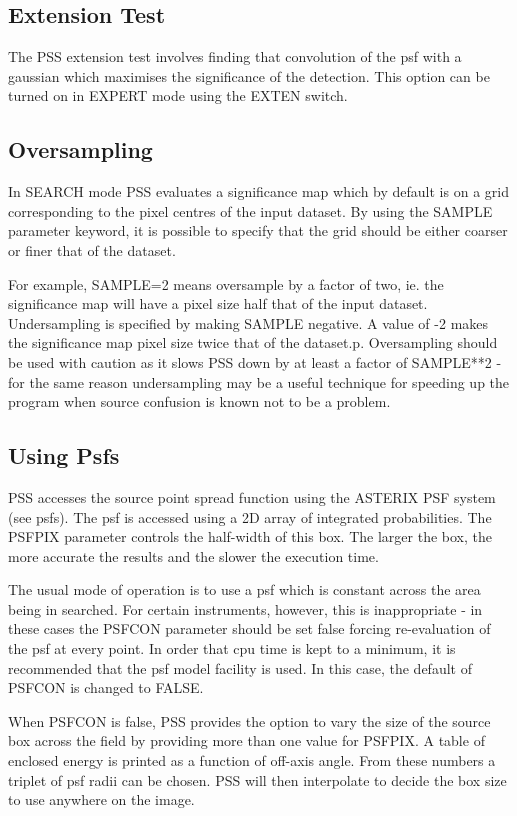 \documentclass{book}
\renewcommand{\_}{{\tt\char'137}}     %
\begin{document}
\subsection{Extension Test}
The PSS extension test involves finding that convolution of the psf
with a gaussian which maximises the significance of the detection.
This option can be turned on in EXPERT mode using the EXTEN switch.
 
\subsection{Oversampling}
In SEARCH mode PSS evaluates a significance map which by default is
on a grid corresponding to the pixel centres of the input dataset.
By using the SAMPLE parameter keyword, it is possible to specify
that the grid should be either coarser or finer that of the dataset.
 
For example, SAMPLE=2 means oversample by a factor of two, ie. the
significance map will have a pixel size half that of the input
dataset. Undersampling is specified by making SAMPLE negative. A
value of -2 makes the significance map pixel size twice that of
the dataset.p.
Oversampling should be used with caution as it slows PSS down by at
least a factor of SAMPLE**2 - for the same reason undersampling may
be a useful technique for speeding up the program when source
confusion is known not to be a problem.
 
\subsection{Using Psfs}
PSS accesses the source point spread function using the ASTERIX PSF
system (see psfs). The psf is accessed using a 2D array of
integrated probabilities. The PSFPIX parameter controls the half-width
of this box. The larger the box, the more accurate the results and
the slower the execution time.
 
The usual mode of operation is to use a psf which is constant across
the area being in searched. For certain instruments, however, this
is inappropriate - in these cases the PSFCON parameter should be set
false forcing re-evaluation of the psf at every point. In order that
cpu time is kept to a minimum, it is recommended that the psf model
facility is used. In this case, the default of PSFCON is changed to
FALSE.
 
When PSFCON is false, PSS provides the option to vary the size of
the source box across the field by providing more than one value
for PSFPIX. A table of enclosed energy is printed as a function of
off-axis angle. From these numbers a triplet of psf radii can be
chosen. PSS will then interpolate to decide the box size to use
anywhere on the image.
 
\end{document}
